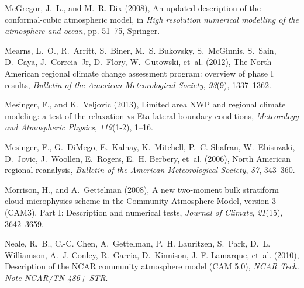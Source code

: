 \documentclass[ms,draft]{agutex}   %
\begin{document}
\begin{article}
\begin{thebibliography}{84}
McGregor, J.~L., and M.~R. Dix (2008), An updated description of the
  conformal-cubic atmospheric model, in \textit{High resolution numerical
  modelling of the atmosphere and ocean}, pp. 51--75, Springer.

Mearns, L.~O., R.~Arritt, S.~Biner, M.~S. Bukovsky, S.~McGinnis, S.~Sain,
  D.~Caya, J.~Correia~Jr, D.~Flory, W.~Gutowski, et~al. (2012), {The North
  American regional climate change assessment program: overview of phase I
  results}, \textit{Bulletin of the American Meteorological Society},
  \textit{93}(9), 1337--1362.

Mesinger, F., and K.~Veljovic (2013), {Limited area NWP and regional climate
  modeling: a test of the relaxation vs Eta lateral boundary conditions},
  \textit{Meteorology and Atmospheric Physics}, \textit{119}(1-2), 1--16.

Mesinger, F., G.~DiMego, E.~Kalnay, K.~Mitchell, P.~C. Shafran, W.~Ebisuzaki,
  D.~Jovic, J.~Woollen, E.~Rogers, E.~H. Berbery, et~al. (2006), {North
  American regional reanalysis}, \textit{Bulletin of the American
  Meteorological Society}, \textit{87}, 343--360.

Morrison, H., and A.~Gettelman (2008), {A new two-moment bulk stratiform cloud
  microphysics scheme in the Community Atmosphere Model, version 3 (CAM3). Part
  I: Description and numerical tests}, \textit{Journal of Climate},
  \textit{21}(15), 3642--3659.

Neale, R.~B., C.-C. Chen, A.~Gettelman, P.~H. Lauritzen, S.~Park, D.~L.
  Williamson, A.~J. Conley, R.~Garcia, D.~Kinnison, J.-F. Lamarque, et~al.
  (2010{}), {Description of the NCAR community atmosphere model
  (CAM 5.0)}, \textit{NCAR Tech. Note NCAR/TN-486+ STR}.


\end{thebibliography}
\end{article}
\end{document}
